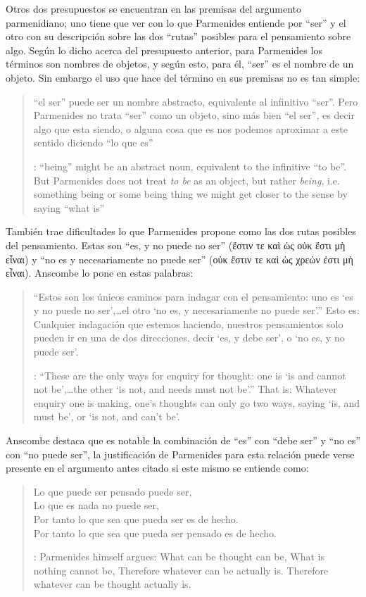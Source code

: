   Otros dos presupuestos se encuentran en las premisas del argumento parmenidiano; uno tiene que ver con lo que Parmenides entiende por \enquote{ser} y el otro con su descripción sobre las dos \enquote{rutas} posibles para el pensamiento sobre algo. Según lo dicho acerca del presupuesto anterior, para Parmenides los términos son nombres de objetos, y según esto, para él, \enquote{ser} es el nombre de un objeto. Sin embargo el uso que hace del término en sus premisas no es tan simple: \blockquote[{\cite[x]{anscombe1981parmenides}}: ``being'' might be an abstract noun, equivalent to the infinitive ``to be''. But Parmenides does not treat \emph{to be} as an object, but rather \emph{being}, i.e. something being or some being thing \textelp{} we might get closer to the sense by saying ``what is'']{``el ser'' puede ser un nombre abstracto, equivalente al infinitivo ``ser''. Pero Parmenides no trata ``ser'' como un objeto, sino más bien ``el ser'', es decir algo que esta siendo, o alguna cosa que es \textelp{} nos podemos aproximar a este sentido diciendo ``lo que es''}. También trae dificultades lo que Parmenides propone como las dos rutas posibles del pensamiento. Estas son \enquote{es, y no puede no ser} (\textgreek{ἔστιν τε καὶ ὡς οὐκ ἔστι μὴ εἶναι}) y \enquote{no es y necesariamente no puede ser} (\textgreek{οὐκ ἔστιν τε καὶ ὡς χρεών ἐστι μὴ εἶναι}). Anscombe lo pone en estas palabras: \blockquote[{\cite[x]{anscombe1981parmenides}}: ``These are the only ways for enquiry for thought: one is `is and cannot not be',\ldots the other `is not, and needs must not be'.'' That is: Whatever enquiry one is making, one's thoughts can only go two ways, saying `is, and must be', or `is not, and can't be'.]{``Estos son los únicos caminos para indagar con el pensamiento: uno es `es y no puede no ser',\ldots el otro `no es, y necesariamente no puede ser'.'' Esto es: Cualquier indagación que estemos haciendo, nuestros pensamientos solo pueden ir en una de dos direcciones, decir `es, y debe ser', o `no es, y no puede ser'.} Anscombe destaca que es notable la combinación de \enquote{es} con \enquote{debe ser}  y \enquote{no es} con \enquote{no puede ser}, la justificación de Parmenides para esta relación puede verse presente en el argumento antes citado si este mismo se entiende como: \blockquote[{\cite[vii]{anscombe1981parmenides}}: Parmenides himself argues: What can be thought can be, What is nothing cannot be, Therefore whatever can be actually is. Therefore whatever can be thought actually is.]{Lo que puede ser pensado puede ser,\\
      Lo que es nada no puede ser,\\
      Por tanto lo que sea que pueda ser es de hecho.\\
      Por tanto lo que sea que pueda ser pensado es de hecho.}

